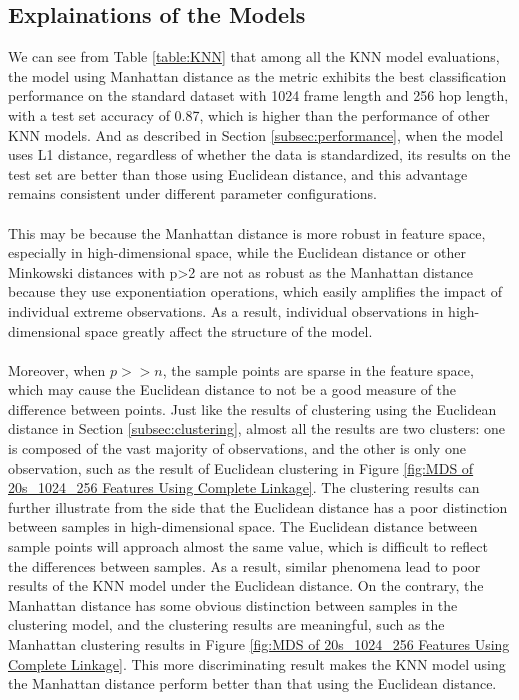 \subsection{Explainations of the Models}\label{subsec:explaination}
We can see from Table \ref{table:KNN} that among all the KNN model evaluations, the model using Manhattan distance as the metric exhibits the best classification performance on the standard dataset with 1024 frame length and 256 hop length, with a test set accuracy of 0.87, which is higher than the performance of other KNN models. And as described in Section \ref{subsec:performance}, when the model uses L1 distance, regardless of whether the data is standardized, its results on the test set are better than those using Euclidean distance, and this advantage remains consistent under different parameter configurations.\\
\\
This may be because the Manhattan distance is more robust in feature space, especially in high-dimensional space, while the Euclidean distance or other Minkowski distances with p>2 are not as robust as the Manhattan distance because they use exponentiation operations, which easily amplifies the impact of individual extreme observations. As a result, individual observations in high-dimensional space greatly affect the structure of the model.\\
\\
Moreover, when $p>>n$, the sample points are sparse in the feature space, which may cause the Euclidean distance to not be a good measure of the difference between points. Just like the results of clustering using the Euclidean distance in Section \ref{subsec:clustering}, almost all the results are two clusters: one is composed of the vast majority of observations, and the other is only one observation, such as the result of Euclidean clustering in Figure \ref{fig:MDS of 20s_1024_256 Features Using Complete Linkage}. The clustering results can further illustrate from the side that the Euclidean distance has a poor distinction between samples in high-dimensional space. The Euclidean distance between sample points will approach almost the same value, which is difficult to reflect the differences between samples. As a result, similar phenomena lead to poor results of the KNN model under the Euclidean distance. On the contrary, the Manhattan distance has some obvious distinction between samples in the clustering model, and the clustering results are meaningful, such as the Manhattan clustering results in Figure \ref{fig:MDS of 20s_1024_256 Features Using Complete Linkage}. This more discriminating result makes the KNN model using the Manhattan distance perform better than that using the Euclidean distance.\\
